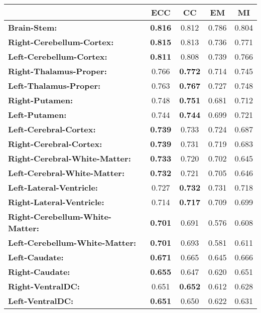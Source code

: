 \begin{table*}[h!]
  \centering
  {\small
    \begin{tabular}{lcccc}
    \toprule
    \textbf{}& \textbf{ECC} & \textbf{CC} & \textbf{EM} & \textbf{MI} \\
    \midrule
        \textbf{Brain-Stem:} & \textbf{0.816} & 0.812 & 0.786 & 0.804 \\
    \textbf{Right-Cerebellum-Cortex:} & \textbf{0.815} & 0.813 & 0.736 & 0.771 \\
    \textbf{Left-Cerebellum-Cortex:} & \textbf{0.811} & 0.808 & 0.739 & 0.766 \\
    \textbf{Right-Thalamus-Proper:} & 0.766 & \textbf{0.772} & 0.714 & 0.745 \\
    \textbf{Left-Thalamus-Proper:} & 0.763 & \textbf{0.767} & 0.727 & 0.748 \\
    \textbf{Right-Putamen:} & 0.748 & \textbf{0.751} & 0.681 & 0.712 \\
    \textbf{Left-Putamen:} & 0.744 & \textbf{0.744} & 0.699 & 0.721 \\
    \textbf{Left-Cerebral-Cortex:} & \textbf{0.739} & 0.733 & 0.724 & 0.687 \\
    \textbf{Right-Cerebral-Cortex:} & \textbf{0.739} & 0.731 & 0.719 & 0.683 \\
    \textbf{Right-Cerebral-White-Matter:} & \textbf{0.733} & 0.720 & 0.702 & 0.645 \\
    \textbf{Left-Cerebral-White-Matter:} & \textbf{0.732} & 0.721 & 0.705 & 0.646 \\
    \textbf{Left-Lateral-Ventricle:} & 0.727 & \textbf{0.732} & 0.731 & 0.718 \\
    \textbf{Right-Lateral-Ventricle:} & 0.714 & \textbf{0.717} & 0.709 & 0.699 \\
    \textbf{Right-Cerebellum-White-Matter:} & \textbf{0.701} & 0.691 & 0.576 & 0.608 \\
    \textbf{Left-Cerebellum-White-Matter:} & \textbf{0.701} & 0.693 & 0.581 & 0.611 \\
    \textbf{Left-Caudate:} & \textbf{0.671} & 0.665 & 0.645 & 0.666 \\
    \textbf{Right-Caudate:} & \textbf{0.655} & 0.647 & 0.620 & 0.651 \\
    \textbf{Right-VentralDC:} & 0.651 & \textbf{0.652} & 0.612 & 0.628 \\
    \textbf{Left-VentralDC:} & \textbf{0.651} & 0.650 & 0.622 & 0.631 \\

\end{tabular}}
\end{table*}
